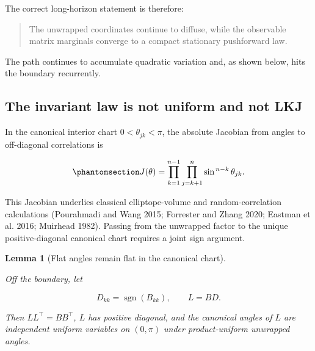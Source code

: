 \documentclass[
  english,
  11pt,
  letterpaper,
  DIV=11,
  numbers=noendperiod]{scrartcl}
\theoremstyle{plain}
\theoremstyle{plain}
\theoremstyle{plain}
\newtheorem{lemma}{Lemma}[section]
\theoremstyle{plain}
\theoremstyle{remark}
\begin{document}
The correct long-horizon statement is therefore:

\begin{quote}
The unwrapped coordinates continue to diffuse, while the observable
matrix marginals converge to a compact stationary pushforward law.
\end{quote}

The path continues to accumulate quadratic variation and, as shown
below, hits the boundary recurrently.

\subsection{The invariant law is not uniform and not
LKJ}\label{the-invariant-law-is-not-uniform-and-not-lkj}

In the canonical interior chart \(0<\theta_{jk}<\pi\), the absolute
Jacobian from angles to off-diagonal correlations is

\begin{equation}\protect\phantomsection\label{eq-angle-jacobian}{
J(\theta)
=\prod_{k=1}^{n-1}
\prod_{j=k+1}^n
\sin^{\,n-k}\theta_{jk}.
}\end{equation}

This Jacobian underlies classical elliptope-volume and
random-correlation calculations (Pourahmadi and Wang 2015; Forrester and
Zhang 2020; Eastman et al. 2016; Muirhead 1982). Passing from the
unwrapped factor to the unique positive-diagonal canonical chart
requires a joint sign argument.

\begin{lemma}[Flat angles remain flat in the canonical
chart]\protect\hypertarget{lem-canonical-folding}{}\label{lem-canonical-folding}

Off the boundary, let

\[
D_{kk}=\operatorname{sgn}(B_{kk}),
\qquad
L=BD.
\]

Then \(LL^\top=BB^\top\), \(L\) has positive diagonal, and the canonical
angles of \(L\) are independent uniform variables on \((0,\pi)\) under
product-uniform unwrapped angles.

\end{lemma}
\end{document}
